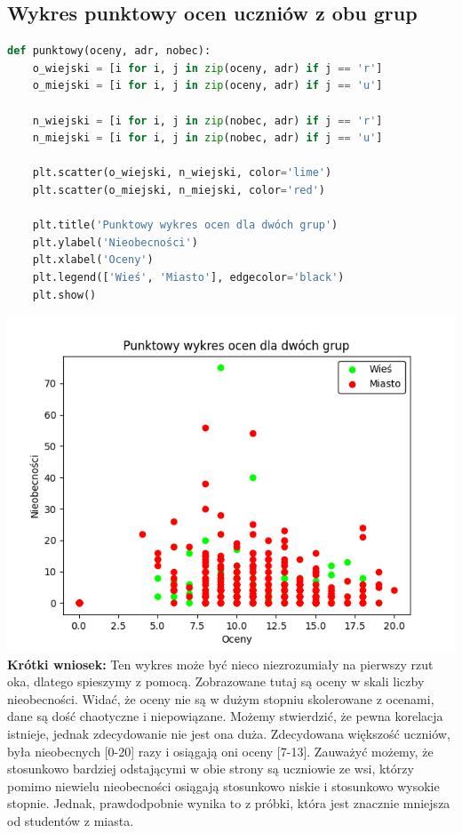 \documentclass{article}
\begin{document}
\subsection{Wykres punktowy ocen uczniów z obu grup}
\begin{lstlisting}[language=Python]
def punktowy(oceny, adr, nobec):
    o_wiejski = [i for i, j in zip(oceny, adr) if j == 'r']
    o_miejski = [i for i, j in zip(oceny, adr) if j == 'u']
    
    n_wiejski = [i for i, j in zip(nobec, adr) if j == 'r']
    n_miejski = [i for i, j in zip(nobec, adr) if j == 'u']
    
    plt.scatter(o_wiejski, n_wiejski, color='lime')
    plt.scatter(o_miejski, n_miejski, color='red')
    
    plt.title('Punktowy wykres ocen dla dwóch grup')
    plt.ylabel('Nieobecności')
    plt.xlabel('Oceny')
    plt.legend(['Wieś', 'Miasto'], edgecolor='black')
    plt.show()
\end{lstlisting}
\includegraphics[width=\textwidth]{punktowy_grupy.png}
\textbf{Krótki wniosek:} Ten wykres może być nieco niezrozumiały na pierwszy rzut oka, dlatego spieszymy z pomocą. Zobrazowane tutaj są oceny w skali liczby nieobecności. Widać, że oceny nie są w dużym stopniu skolerowane z ocenami, dane są dość chaotyczne i niepowiązane. Możemy stwierdzić, że pewna korelacja istnieje, jednak zdecydowanie nie jest ona duża. Zdecydowana większość uczniów, była nieobecnych [0-20] razy i osiągają oni oceny [7-13]. Zauważyć możemy, że stosunkowo bardziej odstającymi w obie strony są uczniowie ze wsi, którzy pomimo niewielu nieobecności osiągają stosunkowo niskie i stosunkowo wysokie stopnie. Jednak, prawdodpobnie wynika to z próbki, która jest znacznie mniejsza od studentów z miasta.
\vspace{15cm}
\end{document}
